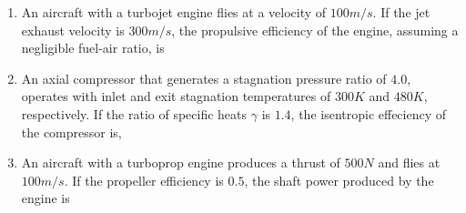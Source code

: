 \documentclass[journal]{IEEEtran}
\begin{document}
\begin{enumerate}
\begin{enumerate}
		\end{enumerate}
	\item An aircraft with a turbojet engine flies at a velocity of $100 m/s$. If the jet exhaust velocity is $300 m/s$, the propulsive efficiency of the engine, assuming a negligible fuel-air ratio, is
	\begin{enumerate}
	\begin{multicols}{2}
		\item  $0.33$
		 \columnbreak
		\item  $0.50$
    \end{multicols}
\end{enumerate}
\item An axial compressor that generates a stagnation pressure ratio of $4.0$, operates with inlet and exit stagnation temperatures of $300 K$ and $480 K$, respectively. If the ratio of specific heats $\gamma$ is $1.4$, the isentropic effeciency of the compressor is,
	\begin{enumerate}
\end{enumerate}
\item An aircraft with a turboprop engine produces a thrust of $500 N$ and flies at $100 m/s$. If the propeller efficiency is $0.5$, the shaft power produced by the engine is 

\end{enumerate}
\end{document}
